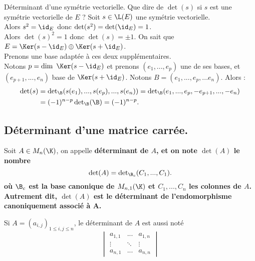 \documentclass[11pt]{article}
\begin{document}
\begin{ex}{Déterminant d'une symétrie vectorielle.}{}
    Que dire de $\det(s)$ si $s$ est une symétrie vectorielle de $E$ ?
    \tcblower
    Soit $s\in\L(E)$ une symétrie vectorielle.\\
    Alors $s^2=\id_E$ donc $\det(s^2)=\det(\id_E)=1$.\\
    Alors $\det(s)^2=1$ donc $\det(s)=\pm1$.\n
    On sait que $E=\Ker(s-\id_E)\oplus\Ker(s+\id_E)$.\\
    Prenons une base adaptée à ces deux supplémentaires.\\
    Notons $p=\dim~\Ker(s-\id_E)$ et prenons $(e_1,...,e_p)$ une de ses bases, et $(e_{p+1},...,e_n)$ base de $\Ker(s+\id_E)$.\n
    Notons $B=(e_1,...,e_p,...e_n)$. Alors :
    \begin{align*}
        \det(s)&=\det\nolimits_{\B}(s(e_1),...,s(e_p),...,s(e_n))
        =\det\nolimits_{\B}(e_1,...,e_p,-e_{p+1},...,-e_n)\\
        &=(-1)^{n-p}\det\nolimits_{\B}(\B)
        =(-1)^{n-p}.
    \end{align*}
\end{ex}

\subsection{Déterminant d'une matrice carrée.}

\begin{defi}{}{}
    Soit $A\in M_n(\K)$, on appelle \bf{déterminant} de $A$, et on note $\det(A)$ le nombre
    \begin{equation*}
        \det(A)=\det\nolimits_{\B_c}(C_1,...,C_1).
    \end{equation*}
    où $\B_c$ est la base canonique de $M_{n,1}(\K)$ et $C_1,...,C_n$ les colonnes de $A$.\n
    Autrement dit, $\det(A)$ est le déterminant de l'endomorphisme canoniquement associé à A.
\end{defi}

\begin{nota}{}{}
    Si $A=(a_{i,j})_{1\leq i,j \leq n}$, le déterminant de $A$ est aussi noté
    \begin{equation*}
        \begin{vmatrix}
            a_{1,1} & ... & a_{1,n} \\
            \vdots & \ddots & \vdots \\
            a_{n,1} & ... & a_{n,n}
        \end{vmatrix}
    \end{equation*}
\end{nota}
\end{document}
